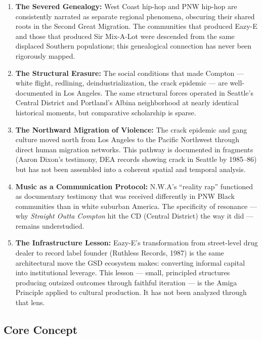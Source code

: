 \documentclass[11pt,letterpaper]{article}
\begin{document}
\begin{enumerate}
  \item \textbf{The Severed Genealogy:} West Coast hip-hop and PNW hip-hop are consistently narrated as separate regional phenomena, obscuring their shared roots in the Second Great Migration. The communities that produced Eazy-E and those that produced Sir Mix-A-Lot were descended from the same displaced Southern populations; this genealogical connection has never been rigorously mapped.

  \item \textbf{The Structural Erasure:} The social conditions that made Compton --- white flight, redlining, deindustrialization, the crack epidemic --- are well-documented in Los Angeles. The same structural forces operated in Seattle's Central District and Portland's Albina neighborhood at nearly identical historical moments, but comparative scholarship is sparse.

  \item \textbf{The Northward Migration of Violence:} The crack epidemic and gang culture moved north from Los Angeles to the Pacific Northwest through direct human migration networks. This pathway is documented in fragments (Aaron Dixon's testimony, DEA records showing crack in Seattle by 1985--86) but has not been assembled into a coherent spatial and temporal analysis.

  \item \textbf{Music as a Communication Protocol:} N.W.A's ``reality rap'' functioned as documentary testimony that was received differently in PNW Black communities than in white suburban America. The specificity of resonance --- why \textit{Straight Outta Compton} hit the CD (Central District) the way it did --- remains understudied.

  \item \textbf{The Infrastructure Lesson:} Eazy-E's transformation from street-level drug dealer to record label founder (Ruthless Records, 1987) is the same architectural move the GSD ecosystem makes: converting informal capital into institutional leverage. This lesson --- small, principled structures producing outsized outcomes through faithful iteration --- is the Amiga Principle applied to cultural production. It has not been analyzed through that lens.
\end{enumerate}

\subsection{Core Concept}
\end{document}
